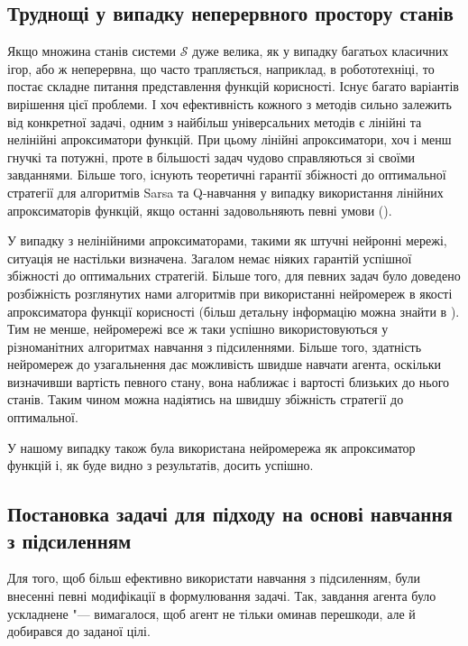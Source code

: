 \documentclass[a4paper,10pt,fleqn]{article}
\begin{document}
\subsection{Труднощі у випадку неперервного простору станів}

Якщо множина станів системи $\mathcal{S}$ дуже велика, як у випадку багатьох класичних ігор, або ж неперервна, що часто трапляється, наприклад, в робототехніці, то постає складне питання представлення функцій корисності. Існує багато варіантів вирішення цієї проблеми. І хоч ефективність кожного з методів сильно залежить від конкретної задачі, одним з найбільш універсальних методів є лінійні та нелінійні апроксиматори функцій. При цьому лінійні апроксиматори, хоч і менш гнучкі та потужні, проте в більшості задач чудово справляються зі своїми завданнями. Більше того, існують теоретичні гарантії збіжності до оптимальної стратегії для алгоритмів Sarsa та Q-навчання у випадку використання лінійних апроксиматорів функцій, якщо останні задовольняють певні умови (\cite{Coulom2002}).

У випадку з нелінійними апроксиматорами, такими як штучні нейронні мережі, ситуація не настільки визначена. Загалом немає ніяких гарантій успішної збіжності до оптимальних стратегій. Більше того, для певних задач було доведено розбіжність розглянутих нами алгоритмів при використанні нейромереж в якості апроксиматора функції корисності (більш детальну інформацію можна знайти в \cite{SuttonBarto2002}). Тим не менше, нейромережі все ж таки успішно використовуються у різноманітних алгоритмах навчання з підсиленнями. Більше того, здатність нейромереж до узагальнення дає можливість швидше навчати агента, оскільки визначивши вартість певного стану, вона наближає і вартості близьких до нього станів. Таким чином можна надіятись на швидшу збіжність стратегії до оптимальної.

У нашому випадку також була використана нейромережа як апроксиматор функцій і, як буде видно з результатів, досить успішно.

\subsection{Постановка задачі для підходу на основі навчання з підсиленням}

Для того, щоб більш ефективно використати навчання з підсиленням, були внесенні певні модифікації в формулювання задачі. Так, завдання агента було ускладнене "--- вимагалося, щоб агент не тільки оминав перешкоди, але й добирався до заданої цілі.
\end{document}
